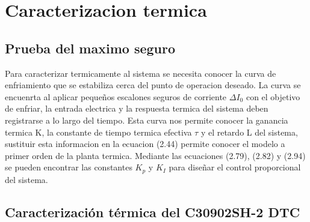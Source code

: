 \chapter{Caracterizacion termica}
\section{Prueba del maximo seguro}
Para caracterizar termicamente al sistema se necesita conocer la curva de enfriamiento que se estabiliza cerca del punto de operacion deseado.
La curva se encuenrta al aplicar pequeños escalones seguros de corriente $\Delta I_{0}$ con el objetivo de enfriar, la entrada electrica y la respuesta termica del sistema deben registrarse a lo largo del tiempo.
Esta curva nos permite conocer la  ganancia termica K, la constante de tiempo termica efectiva $\tau$ y el retardo L del sistema, sustituir esta informacion en la ecuacion (2.44) permite conocer el modelo a primer orden de la planta termica.
Mediante las ecuaciones (2.79), (2.82) y (2.94) se pueden encontrar las constantes $K_{p}$ y $K_{I}$ para diseñar el control proporcional del sistema.
\section{Caracterización térmica del C30902SH-2 DTC}